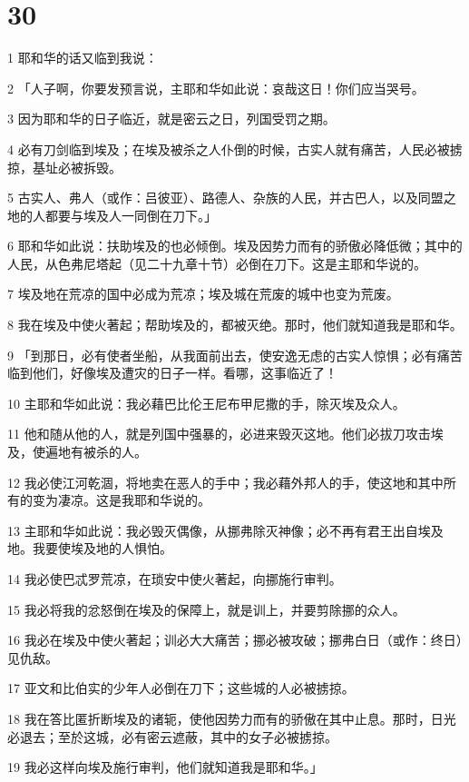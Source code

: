 \chapter{30}

\par 1 耶和华的话又临到我说：
\par 2 「人子啊，你要发预言说，主耶和华如此说：哀哉这日！你们应当哭号。
\par 3 因为耶和华的日子临近，就是密云之日，列国受罚之期。
\par 4 必有刀剑临到埃及；在埃及被杀之人仆倒的时候，古实人就有痛苦，人民必被掳掠，基址必被拆毁。
\par 5 古实人、弗人（或作：吕彼亚）、路德人、杂族的人民，并古巴人，以及同盟之地的人都要与埃及人一同倒在刀下。」
\par 6 耶和华如此说：扶助埃及的也必倾倒。埃及因势力而有的骄傲必降低微；其中的人民，从色弗尼塔起（见二十九章十节）必倒在刀下。这是主耶和华说的。
\par 7 埃及地在荒凉的国中必成为荒凉；埃及城在荒废的城中也变为荒废。
\par 8 我在埃及中使火著起；帮助埃及的，都被灭绝。那时，他们就知道我是耶和华。
\par 9 「到那日，必有使者坐船，从我面前出去，使安逸无虑的古实人惊惧；必有痛苦临到他们，好像埃及遭灾的日子一样。看哪，这事临近了！
\par 10 主耶和华如此说：我必藉巴比伦王尼布甲尼撒的手，除灭埃及众人。
\par 11 他和随从他的人，就是列国中强暴的，必进来毁灭这地。他们必拔刀攻击埃及，使遍地有被杀的人。
\par 12 我必使江河乾涸，将地卖在恶人的手中；我必藉外邦人的手，使这地和其中所有的变为凄凉。这是我耶和华说的。
\par 13 主耶和华如此说：我必毁灭偶像，从挪弗除灭神像；必不再有君王出自埃及地。我要使埃及地的人惧怕。
\par 14 我必使巴忒罗荒凉，在琐安中使火著起，向挪施行审判。
\par 15 我必将我的忿怒倒在埃及的保障上，就是训上，并要剪除挪的众人。
\par 16 我必在埃及中使火著起；训必大大痛苦；挪必被攻破；挪弗白日（或作：终日）见仇敌。
\par 17 亚文和比伯实的少年人必倒在刀下；这些城的人必被掳掠。
\par 18 我在答比匿折断埃及的诸轭，使他因势力而有的骄傲在其中止息。那时，日光必退去；至於这城，必有密云遮蔽，其中的女子必被掳掠。
\par 19 我必这样向埃及施行审判，他们就知道我是耶和华。」
